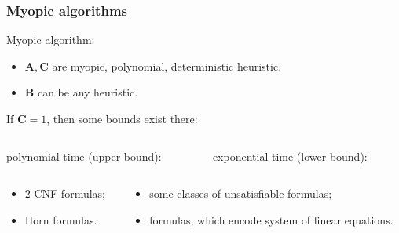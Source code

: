 \begin{frame}
    \frametitle{Myopic algorithms}

    \pause

    \begin{definition}
		Myopic algorithm:
        \begin{itemize}
            \pause
	        \item $\mathbf{A}, \mathbf{C}$ are myopic, polynomial, deterministic heuristic.
            \pause
        	\item $\mathbf{B}$ can be any heuristic.
        \end{itemize}
	\end{definition}

    \pause
    If $\mathbf{C} = 1$, then some bounds exist there:

    \pause
    \begin{columns}
        \begin{column}{5cm}
            polynomial time (upper bound):
        \end{column}
        \begin{column}{5cm}
            exponential time (lower bound):
        \end{column}
    \end{columns}

    \pause
    \begin{columns}
        \begin{column}{5cm}
            \begin{itemize}
		 		\item $2$-CNF formulas;
			    \pause
    			\item Horn formulas.
            \end{itemize}
        \end{column}
        \begin{column}{5cm}
            \begin{itemize}
	            \pause
    	        \item some classes of unsatisfiable formulas;
        		\pause
            	\item formulas, which encode system of linear
		            equations.
            \end{itemize}
        \end{column}
    \end{columns}
\end{frame}

